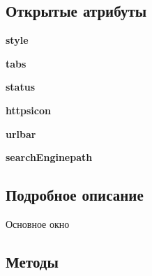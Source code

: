 \subsection*{Открытые атрибуты}
\begin{DoxyCompactItemize}
\item 
\mbox{\label{classbrowser__tabbed_1_1MainWindow_a14d1fae73c3002e8ba236c6140391c4b}} 
{\bfseries style}
\item 
\mbox{\label{classbrowser__tabbed_1_1MainWindow_ad0abd51cd412bc9626820050b5b7580a}} 
{\bfseries tabs}
\item 
\mbox{\label{classbrowser__tabbed_1_1MainWindow_a0bce1a7787b6858eb99066a537fa2841}} 
{\bfseries status}
\item 
\mbox{\label{classbrowser__tabbed_1_1MainWindow_a37930e6a23440b9e61065d7f2f18a1ae}} 
{\bfseries httpsicon}
\item 
\mbox{\label{classbrowser__tabbed_1_1MainWindow_ad493f3d13f67d29f5b07ca779c219c0a}} 
{\bfseries urlbar}
\item 
\mbox{\label{classbrowser__tabbed_1_1MainWindow_a2009fb26a0dfc6aeee3757215d75bc9f}} 
{\bfseries search\+Enginepath}
\end{DoxyCompactItemize}


\subsection{Подробное описание}
\begin{DoxyVerb}Основное окно\end{DoxyVerb}
 

\subsection{Методы}
\mbox{\label{classbrowser__tabbed_1_1MainWindow_a34358ef47ecb6329e58ed64300496d12}} 
